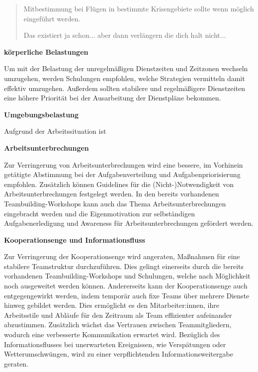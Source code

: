 \documentclass[12pt, a4paper]{article}
\begin{document}
\blockquote{
    \tiny
    Mitbestimmung bei Flügen in bestimmte Krisengebiete sollte wenn möglich eingeführt werden.
    
    Das existiert ja schon... aber dann verlängern die dich halt nicht...
    }

\textbf{körperliche Belastungen}

Um mit der Belastung der unregelmäßigen Dienstzeiten und Zeitzonen wechseln umzugehen, werden Schulungen empfohlen,
welche Strategien vermitteln damit effektiv umzugehen. 
Außerdem sollten stabilere und regelmäßigere Dienstzeiten eine höhere Priorität bei der Ausarbeitung der Dienstpläne bekommen. 

\textbf{Umgebungsbelastung}

Aufgrund der Arbeitssituation ist 





\textbf{Arbeitsunterbrechungen}

Zur Verringerung von Arbeitsunterbrechungen wird eine bessere, 
im Vorhinein getätigte Abstimmung bei der Aufgabenverteilung und Aufgabenpriorisierung empfohlen. 
Zusätzlich können Guidelines für die (Nicht-)Notwendigkeit von Arbeitsunterbrechungen festgelegt werden. 
In den bereits vorhandenen Teambuilding-Workshops kann auch das Thema Arbeitsunterbrechungen eingebracht 
werden und die Eigenmotivation zur selbständigen Aufgabenerledigung und Awareness für Arbeitsunterbrechungen 
gefördert werden.

\textbf{Kooperationsenge und Informationsfluss}

Zur Verringerung der Kooperationsenge wird angeraten, Maßnahmen für eine stabilere Teamstruktur durchzuführen.
Dies gelingt einerseits durch die bereits vorhandenen Teambuilding-Workshops und Schulungen, 
welche nach Möglichkeit noch ausgeweitet werden können. Andererseits kann der Kooperationsenge auch entgegengewirkt werden, 
indem temporär auch fixe Teams über mehrere Dienste hinweg gebildet werden. Dies ermöglicht es den Mitarbeiter:innen,
ihre Arbeitsstile und Abläufe für den Zeitraum als Team effizienter aufeinander abzustimmen.
Zusätzlich wächst das Vertrauen zwischen Teammitgliedern, wodurch eine verbesserte Kommunikation erwartet wird.
Bezüglich des Informationsflusses bei unerwarteten Ereignissen,
wie Verspätungen oder Wetterumschwüngen, wird zu einer verpflichtenden Informationsweitergabe geraten.

\newpage

\printbibliography
\end{document}
